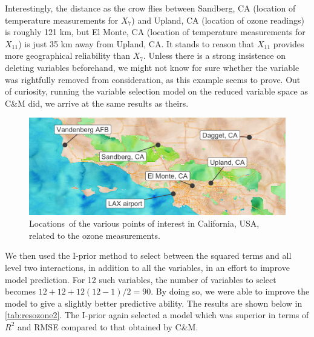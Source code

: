 \documentclass[showframe,11pt,twoside,openright]{report}
\begin{document}
Interestingly, the distance as the crow flies between Sandberg, CA (location of temperature measurements for $X_7$) and Upland, CA (location of ozone readings) is roughly 121 km, but El Monte, CA (location of temperature measurements for $X_{11}$) is just 35 km away from Upland, CA.
It stands to reason that $X_{11}$ provides more geographical reliability than $X_7$.
Unless there is a strong insistence on deleting variables beforehand, we might not know for sure whether the variable was rightfully removed from consideration, as this example seems to prove.
Out of curiosity, running the variable selection model on the reduced variable space as C\&M did, we arrive at the same results as theirs.

\begin{figure}[htb]
  \centering
  \vspace{3pt}
  \includegraphics[width=\textwidth]{figure/06-ozone_map}
  \caption[Locations of the various points of interest in California, USA, related to the ozone measurements]{Locations\footnotemark~of the various points of interest in California, USA, related to the ozone measurements.}
  \label{fig:aerobic-densplot       }
\end{figure}


We then used the I-prior method to select between the squared terms and all level two interactions, in addition to all the variables, in an effort to improve model prediction. 
For 12 such variables, the number of variables to select becomes $12 + 12 + 12(12 - 1)/2 = 90$. 
By doing so, we were able to improve the model to give a slightly better predictive ability.
The results are shown below in \cref{tab:resozone2}. 
The I-prior again selected a model which was superior in terms of $R^2$ and RMSE compared to that obtained by C\&M.
\end{document}
